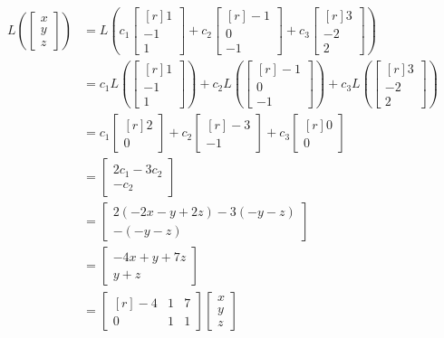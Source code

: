 \documentclass[12pt]{article}
\begin{document}
\begin{align*}
L\left(\begin{bmatrix}x\\y\\z\end{bmatrix}\right)&=
L\left(
c_1\begin{bmatrix*}[r] 1\\ -1\\ 1\end{bmatrix*}+
c_2\begin{bmatrix*}[r] -1\\ 0\\-1\end{bmatrix*}+
c_3\begin{bmatrix*}[r] 3\\ -2\\ 2\end{bmatrix*}
\right)\\
&=
c_1L\left(\begin{bmatrix*}[r] 1\\ -1\\ 1\end{bmatrix*}\right)+
c_2L\left(\begin{bmatrix*}[r] -1\\ 0\\-1\end{bmatrix*}\right)+
c_3L\left(\begin{bmatrix*}[r] 3\\ -2\\ 2\end{bmatrix*}\right)\\
&=
c_1\begin{bmatrix*}[r] 2\\0 \end{bmatrix*}
+c_2\begin{bmatrix*}[r] -3\\-1 \end{bmatrix*}
+c_3\begin{bmatrix*}[r] 0\\0 \end{bmatrix*}\\
&=
\begin{bmatrix} 2c_1-3c_2\\-c_2\end{bmatrix}\\
&=
\begin{bmatrix} 
2(- 2 x - y + 2 z)-3(- y - z)\\
-(- y - z) 
\end{bmatrix}\\
&=
\begin{bmatrix}
-4x+y+7z \\ y+z
\end{bmatrix}\\
&=
\begin{bmatrix*}[r] -4 & 1 & 7 \\ 0 & 1 & 1\end{bmatrix*}
\begin{bmatrix}x\\y\\z\end{bmatrix}
\end{align*}
\proofend
\end{document}
